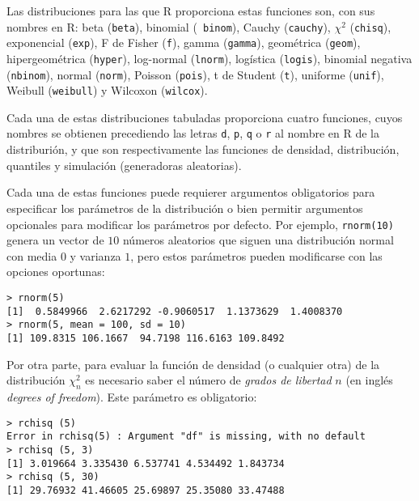 Las distribuciones  para las que  {\sf R} proporciona  estas funciones
son, con  sus nombres en  {\sf R}:  beta ({\tt beta}),  binomial ({\tt
binom}), Cauchy  ({\tt cauchy}),  $\chi^2$ ({\tt  chisq}), exponencial
({\tt exp}),  F de Fisher  ({\tt f}), gamma ({\tt  gamma}), geométrica
({\tt geom}), hipergeométrica ({\tt hyper}), log-normal ({\tt lnorm}),
logística  ({\tt logis}),  binomial  negativa  ({\tt nbinom}),  normal
({\tt norm}), Poisson  ({\tt pois}), t de Student  ({\tt t}), uniforme
({\tt unif}), Weibull ({\tt weibull}) y Wilcoxon ({\tt wilcox}).

Cada  una   de  estas  distribuciones  tabuladas   proporciona  cuatro
funciones, cuyos nombres  se obtienen precediendo las  letras {\tt d},
{\tt p}, {\tt q} o {\tt r} al  nombre en {\sf R} de la distriburión, y
que  son  respectivamente  las funciones  de  densidad,  distribución,
quantiles y simulación (generadoras aleatorias).


Cada una  de estas  funciones puede requierer  argumentos obligatorios
para especificar  los parámetros  de la  distribución o  bien permitir
argumentos opcionales  para modificar los parámetros  por defecto. Por
ejemplo, {\tt rnorm(10)}  genera un vector de  $10$ números aleatorios
que siguen una distribución normal con  media $0$ y varianza $1$, pero
estos parámetros pueden modificarse con las opciones oportunas:

\begin{verbatim}
> rnorm(5)
[1]  0.5849966  2.6217292 -0.9060517  1.1373629  1.4008370
> rnorm(5, mean = 100, sd = 10)
[1] 109.8315 106.1667  94.7198 116.6163 109.8492
\end{verbatim}

Por otra parte, para evaluar la función de densidad (o cualquier otra)
de la  distribución $\chi^2_n$  es necesario saber  el número  de {\em
grados de libertad} $n$ (en inglés {\em degrees of freedom}). Este 
parámetro es obligatorio:

\begin{verbatim}
> rchisq (5)
Error in rchisq(5) : Argument "df" is missing, with no default
> rchisq (5, 3)
[1] 3.019664 3.335430 6.537741 4.534492 1.843734
> rchisq (5, 30)
[1] 29.76932 41.46605 25.69897 25.35080 33.47488
\end{verbatim}

